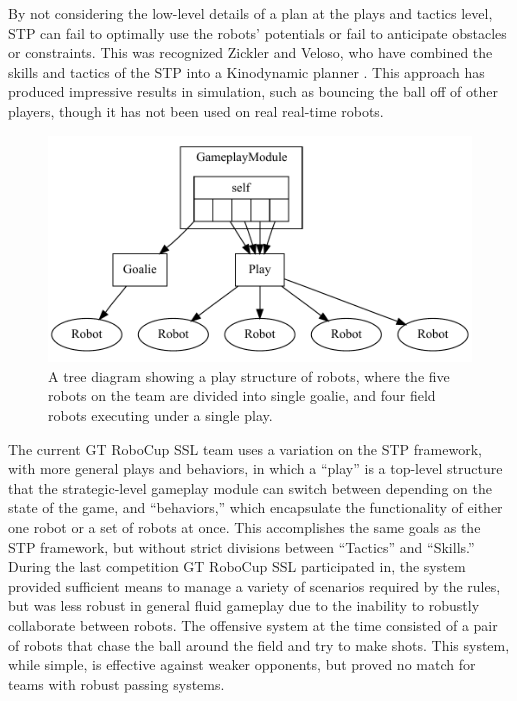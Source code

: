 \documentclass[a4paper, 10pt, conference]{ieeeconf}      %
\begin{document}
By not considering the low-level details of a plan at the plays and tactics level, STP can fail to optimally use the robots' potentials or fail to anticipate obstacles or constraints. This was recognized Zickler and Veloso, who have combined the skills and tactics of the STP into a Kinodynamic planner \cite{zickler2008playing}. This approach has produced impressive results in simulation, such as bouncing the ball off of other players, though it has not been used on real real-time robots.

\begin{figure}[ht!]
\begin{center}
\includegraphics[totalheight=1.6in]{gen_play}
\end{center}
\caption{A tree diagram showing a play structure of robots, where the five robots on the team are divided into single goalie, and four field robots executing under a single play.}
\label{fig:play_structure}
\end{figure}

The current GT RoboCup SSL team uses a variation on the STP framework, with more general plays and behaviors, in which a ``play'' is a top-level structure that the strategic-level gameplay module can switch between depending on the state of the game, and ``behaviors,'' which encapsulate the functionality of either one robot or a set of robots at once.  This accomplishes the same goals as the STP framework, but without strict divisions between ``Tactics'' and ``Skills.'' During the last competition GT RoboCup SSL participated in, the system provided sufficient means to manage a variety of scenarios required by the rules, but was less robust in general fluid gameplay due to the inability to robustly collaborate between robots.  The offensive system at the time consisted of a pair of robots that chase the ball around the field and try to make shots.  This system, while simple, is effective against weaker opponents, but proved no match for teams with robust passing systems.  
\end{document}
